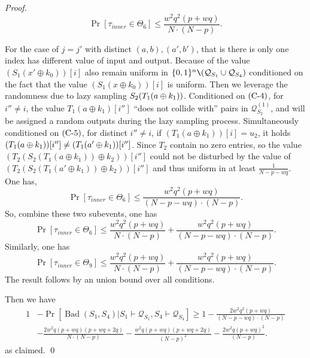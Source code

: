 \begin{proof}
$$
\operatorname{Pr}\left[\tau_{inner} \in \Theta_{6}\right] \leq \frac{w^{2} q^{2} (p+w q)}{N \cdot (N-p)}.
$$

For the case of $j=j'$ with distinct $(a,b),(a',b')$, that is there is only one index has different value of input and output. Because of the value $\left(S_{1}\left(x' \oplus k_{0}\right)\right)[i]$ also remain uniform in $\{0, 1\}^{n} \verb|\| (\mathcal{Q}_{S_{1}} \cup \mathcal{Q}_{S_{4}})$ conditioned on the fact that the value $\left(S_{1}\left(x \oplus k_{0}\right)\right)[i]$ is uniform. Then we leverage the randomness due to lazy sampling $S_2(T_1(a\oplus k_1))$. Conditioned on $\text{(C-4)}$, for $i''\neq i$, the value $T_1(a \oplus k_1)[i'']$ ``does not collide with'' pairs in $\mathcal{Q}_{S_{2}}^{(1)}$, and will be assigned a random outputs during the lazy sampling process. Simultaneously conditioned on $\text{(C-5)}$, for distinct $i'' \neq i$, if $(T_1\left(a \oplus k_{1}\right))[i] = u_2$, it holds $(T_1(a\oplus k_1))[i'']\neq(T_1(a'\oplus k_1))[i'']$. Since $T_2$ contain no zero entries, so the value $\left(T_{2}\left(S_{2}\left(T_1\left(a \oplus k_{1}\right)\right) \oplus k_{2}\right)\right)[i'']$ could not be disturbed by the value of $\left(T_{2}\left(S_{2}\left(T_1\left(a' \oplus k_{1}\right)\right) \oplus k_{2}\right)\right)[i'']$ and thus uniform in at least
$\frac{1}{N - p- wq}$. One has,
$$
\operatorname{Pr}\left[\tau_{inner} \in \Theta_{6}\right] \leq \frac{w^{2} q^{2} (p+w q)}{(N- p- wq) \cdot (N-p)}.
$$
So, combine these two subevents, one has
$$
\operatorname{Pr}\left[\tau_{inner} \in \Theta_{6}\right] \leq \frac{w^{2} q^{2} (p+w q)}{N \cdot (N-p)} + \frac{w^{2} q^{2} (p+w q)}{(N- p- wq) \cdot (N- p)}.
$$
%
Similarly, one has
%
$$
\operatorname{Pr}\left[\tau_{inner} \in \Theta_{9}\right] \leq \frac{w^{2} q^{2} (p+w q)}{N \cdot (N-p)} + \frac{w^{2} q^{2} (p+w q)}{(N- p- wq) \cdot (N-p)}.
$$
The result follows by an union bound over all conditions.


Then we have
$$
\begin{aligned}
1&-\operatorname{Pr}\left[\operatorname{Bad}\left(S_{1},S_{4}\right) | S_{1} \vdash \mathcal{Q}_{S_{1}},S_{4} \vdash \mathcal{Q}_{S_{4}}\right] \geq 1 - \frac{2 w^{2} q^{2} (p+w q)}{(N- p- wq) \cdot (N-p)}\\
& -\frac{2 w^{2} q (p+w q)(p+w q+2 q)}{N \cdot (N-p)} - \frac{w^{2} q (p+w q)(p+w q+2 q)}{(N-p)^2} - \frac{2 w^{2} q (p+w q)^{2}}{(N-p)}.
\end{aligned}
$$
as claimed.       \qed
\end{proof}



